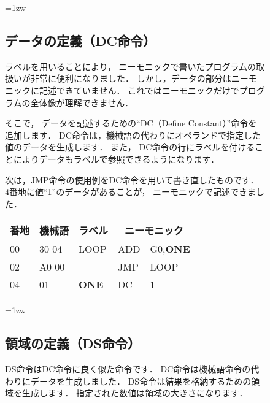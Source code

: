 \begin{figure}[btp]
\begin{framed}{\parindent=1zw
\subsection*{データの定義（DC命令）}
ラベルを用いることにより，
ニーモニックで書いたプログラムの取扱いが非常に便利になりました．
しかし，データの部分はニーモニックに記述できていません．
これではニーモニックだけでプログラムの全体像が理解できません．

そこで，
データを記述するための``DC（Define Constant）''命令を追加します．
DC命令は，機械語の代わりにオペランドで指定した値のデータを生成します．
また，
DC命令の行にラベルを付けることによりデータもラベルで参照できるようになります．

次は，JMP命令の使用例をDC命令を用いて書き直したものです．
4番地に値``1''のデータがあることが，
ニーモニックで記述できました．

{\small\tt\begin{center}
\begin{tabular}{|l|l|l|l l|} \hline
番地 & 機械語 & ラベル & \multicolumn{2}{|c|}{ニーモニック} \\
\hline
00 & 30 04 & LOOP       & ADD  & G0,{\bf ONE}  \\
02 & A0 00 &            & JMP  & LOOP          \\
04 & 01    & {\bf ONE}  & DC   & 1             \\
\hline
\end{tabular}
\end{center}}
}\end{framed}
\end{figure}

\begin{figure}[btp]
\begin{framed}{\parindent=1zw
\subsection*{領域の定義（DS命令）}
DS命令はDC命令に良く似た命令です．
DC命令は機械語命令の代わりにデータを生成しました．
DS命令は結果を格納するための領域を生成します．
指定された数値は領域の大きさになります．
}\end{framed}
\end{figure}

